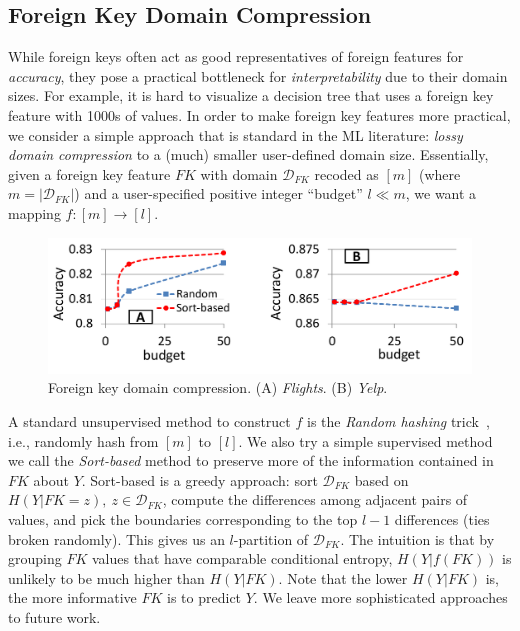 \documentclass{vldb}
\begin{document}
\subsection{Foreign Key Domain Compression}

While foreign keys often act as good representatives of foreign features for \textit{accuracy},
they pose a practical bottleneck for \textit{interpretability} due to their domain sizes.
For example, it is hard to visualize a decision tree that uses a foreign key feature with 1000s of values.
In order to make foreign key features more practical, we consider a simple approach that is standard in the ML literature:
\textit{lossy domain compression} to a (much) smaller user-defined domain size. Essentially, given a 
foreign key feature $FK$ with domain $\mathcal{D}_{FK}$ recoded as $[m]$ (where $m = |\mathcal{D}_{FK}|$) and a user-specified 
positive integer ``budget'' $l \ll m$, we want a mapping $f: [m] \rightarrow [l]$.

\begin{figure}[t]
\centering
\includegraphics[width=0.99\linewidth]{dom_comp.pdf}
\caption{Foreign key domain compression. (A) \textit{Flights}. (B) \textit{Yelp}.}
\label{Figure:Compression}
\end{figure}

A standard unsupervised method to construct $f$ is the \textit{Random hashing} trick~\cite{hashingtrick}, i.e., randomly hash from $[m]$ to $[l]$.
We also try a simple supervised method we call the \textit{Sort-based} method to preserve more of the information contained 
in $FK$ about $Y$. Sort-based is a greedy approach: sort $\mathcal{D}_{FK}$ based on $H(Y|FK=z), ~z \in \mathcal{D}_{FK}$, compute the 
differences among adjacent pairs of values, and pick the boundaries corresponding to the top $l-1$ differences (ties broken randomly). 
This gives us an $l$-partition of $\mathcal{D}_{FK}$. The intuition is that by grouping $FK$ values that have comparable conditional entropy, 
$H(Y|f(FK))$ is unlikely to be much higher than $H(Y|FK)$. Note that the lower $H(Y|FK)$ is, the more informative $FK$ is to predict $Y$. 
We leave more sophisticated approaches to future work.
\end{document}
